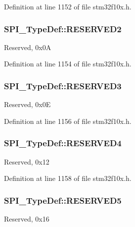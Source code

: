 Definition at line 1152 of file stm32f10x.\-h.

\hypertarget{struct_s_p_i___type_def_a09ce56649bb5477e2fcf3e92bca8f735}{
\subsubsection[{R\-E\-S\-E\-R\-V\-E\-D2}]{ S\-P\-I\-\_\-\-Type\-Def\-::\-R\-E\-S\-E\-R\-V\-E\-D2}}\label{struct_s_p_i___type_def_a09ce56649bb5477e2fcf3e92bca8f735}
Reserved, 0x0\-A 

Definition at line 1154 of file stm32f10x.\-h.

\hypertarget{struct_s_p_i___type_def_aeb1d1d561f1d51232369197fa7acb53a}{
\subsubsection[{R\-E\-S\-E\-R\-V\-E\-D3}]{ S\-P\-I\-\_\-\-Type\-Def\-::\-R\-E\-S\-E\-R\-V\-E\-D3}}\label{struct_s_p_i___type_def_aeb1d1d561f1d51232369197fa7acb53a}
Reserved, 0x0\-E 

Definition at line 1156 of file stm32f10x.\-h.

\hypertarget{struct_s_p_i___type_def_a20e3ac1445ed1e7a9792ca492c46a73a}{
\subsubsection[{R\-E\-S\-E\-R\-V\-E\-D4}]{ S\-P\-I\-\_\-\-Type\-Def\-::\-R\-E\-S\-E\-R\-V\-E\-D4}}\label{struct_s_p_i___type_def_a20e3ac1445ed1e7a9792ca492c46a73a}
Reserved, 0x12 

Definition at line 1158 of file stm32f10x.\-h.

\hypertarget{struct_s_p_i___type_def_ab63440e38c7872a8ed11fb2d8d94714e}{
\subsubsection[{R\-E\-S\-E\-R\-V\-E\-D5}]{ S\-P\-I\-\_\-\-Type\-Def\-::\-R\-E\-S\-E\-R\-V\-E\-D5}}\label{struct_s_p_i___type_def_ab63440e38c7872a8ed11fb2d8d94714e}
Reserved, 0x16 

